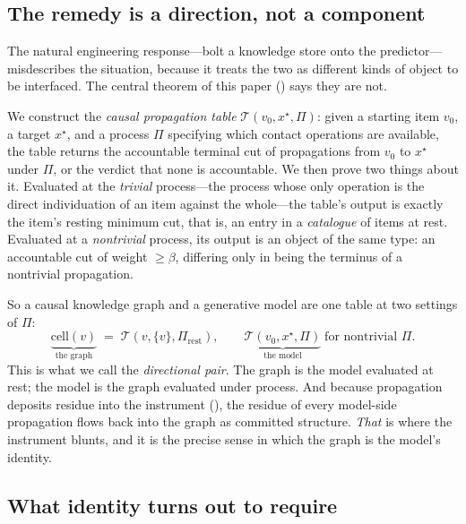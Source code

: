 \documentclass[11pt,twocolumn,a4paper]{article}
\theoremstyle{dirthm}
\theoremstyle{definition}
\theoremstyle{remark}
\newcommand{\flo}{\beta}
\newcommand{\Proc}{\Pi}
\newcommand{\Tab}{\mathcal{T}}
\newcommand{\cell}{\mathrm{cell}}
\begin{document}
\subsection{The remedy is a direction, not a component}

The natural engineering response---bolt a knowledge store onto the
predictor---misdescribes the situation, because it treats the two as
different kinds of object to be interfaced. The central theorem of this paper
() says they are not.

We construct the \emph{causal propagation table}
$\Tab(v_0,x^{\star},\Proc)$: given a starting item $v_0$, a target
$x^{\star}$, and a process $\Proc$ specifying which contact operations are
available, the table returns the accountable terminal cut of propagations
from $v_0$ to $x^{\star}$ under $\Proc$, or the verdict that none is
accountable. We then prove two things about it. Evaluated at the
\emph{trivial} process---the process whose only operation is the direct
individuation of an item against the whole---the table's output is exactly
the item's resting minimum cut, that is, an entry in a \emph{catalogue} of
items at rest. Evaluated at a \emph{nontrivial} process, its output is an
object of the same type: an accountable cut of weight $\ge\flo$, differing
only in being the terminus of a nontrivial propagation.

So a causal knowledge graph and a generative model are one table at two
settings of $\Proc$:
\[
\underbrace{\cell(v)}_{\text{the graph}}
\;=\;\Tab(v,\{v\},\Proc_{\mathrm{rest}}),
\qquad
\underbrace{\Tab(v_0,x^{\star},\Proc)}_{\text{the model}}
\;\text{for nontrivial }\Proc.
\]
This is what we call the \emph{directional pair}. The graph is the model
evaluated at rest; the model is the graph evaluated under process. And
because propagation deposits residue into the instrument
(), the residue of every model-side propagation flows back
into the graph as committed structure. \emph{That} is where the instrument
blunts, and it is the precise sense in which the graph is the model's
identity.

\subsection{What identity turns out to require}
\end{document}

